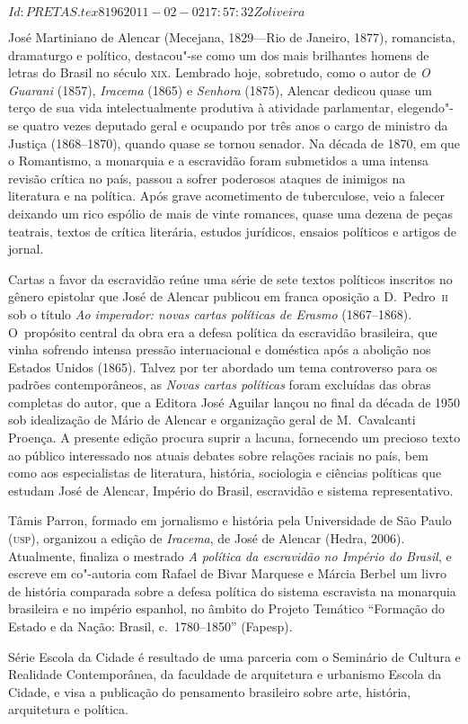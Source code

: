 \SVN $Id: PRETAS.tex 8196 2011-02-02 17:57:32Z oliveira $
\begin{resumopage}
\item[José Martiniano de Alencar] (Mecejana, 1829---Rio de Janeiro, 1877), romancista, dramaturgo e político, 
destacou"-se como um dos mais brilhantes homens de letras do Brasil no século \textsc{xix}. Lembrado hoje, sobretudo, 
como o autor de \textit{O Guarani} (1857), \textit{Iracema} (1865) e \textit{Senhora} (1875), Alencar dedicou quase um terço de sua vida 
intelectualmente produtiva à atividade parlamentar, elegendo"-se quatro vezes deputado geral 
e ocupando por três anos o cargo de ministro da Justiça (1868--1870), quando quase se tornou senador. Na década de 
1870, em que o Romantismo, a monarquia e a escravidão foram submetidos a uma intensa revisão crítica no país, 
passou a sofrer poderosos ataques de inimigos na literatura e na política. Após grave acometimento de tuberculose, 
veio a falecer deixando um rico espólio de mais de vinte romances, quase uma dezena de peças teatrais, textos de 
crítica literária, estudos jurídicos, ensaios políticos e artigos de jornal. 

\item[Cartas a favor da escravidão] reúne uma série de sete textos políticos inscritos 
no gênero epistolar que José de Alencar publicou em franca oposição a D.~Pedro~\textsc{ii} sob o título 
\textit{Ao imperador: novas cartas políticas de Erasmo} (1867--1868). \mbox{O propósito} central da obra era a 
defesa política da escravidão brasileira, que vinha sofrendo intensa pressão internacional e doméstica 
após a abolição nos Estados Unidos (1865). Talvez por ter abordado um tema controverso para os padrões 
contemporâneos, as \textit{Novas cartas políticas} foram excluídas das obras completas do autor, que a Editora José Aguilar 
lançou no final da década de 1950 sob idealização de Mário de Alencar e organização geral de M.~Cavalcanti Proença. 
A presente edição procura suprir a lacuna, fornecendo um precioso texto ao público interessado nos atuais 
debates sobre relações raciais no país, bem como aos especialistas de literatura, história, sociologia e 
ciências políticas que estudam José de Alencar, Império do Brasil, escravidão e sistema representativo.
 
\item[Tâmis Parron,] formado em jornalismo e história pela Universidade de São
Paulo (\textsc{usp}), organizou a edição de \textit{Iracema}, de José de Alencar
(Hedra, 2006). Atualmente, finaliza o mestrado \textit{A política da escravidão
no Império do Brasil}, e escreve em co"-autoria com Rafael de Bivar Marquese e
Márcia Berbel um livro de história comparada sobre a defesa política do sistema
escravista na monarquia brasileira e no império espanhol, no âmbito do Projeto
Temático ``Formação do Estado e da Nação: Brasil, c.~1780--1850'' (Fapesp).

\item[Série Escola da Cidade] é resultado de uma parceria com o Seminário de
Cultura e Realidade Contemporânea, da faculdade de arquitetura e urbanismo
Escola da Cidade, e visa a publicação do pensamento brasileiro sobre arte,
história, arquitetura e política. 

\end{resumopage}

